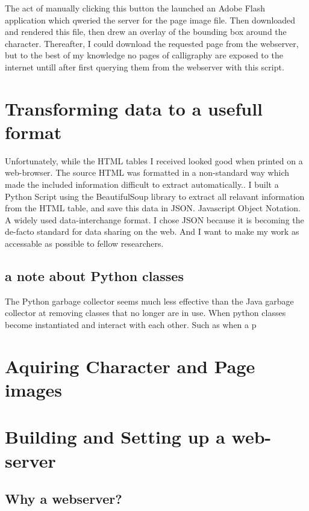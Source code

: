 The act of manually clicking this button the launched an Adobe Flash application which qweried the server for the page image file.  Then downloaded and rendered this file, then drew an overlay of the bounding box around the character.  Thereafter, I could download the requested page from the webserver, but to the best of my knowledge no pages of calligraphy are exposed to the internet untill after first querying them from the webserver with this script.


\section{Transforming data to a usefull format}

Unfortunately, while the HTML tables I received looked good when printed on a web-browser.  The source HTML was formatted in a non-standard way which made the included information difficult to extract automatically..  I built a Python Script using the BeautifulSoup library to extract all relavant information from the HTML table, and save this data in JSON.  Javascript Object Notation.  A widely used data-interchange format.  I chose JSON because it is becoming the de-facto standard for data sharing on the web.  And I want to make my work as accessable as possible to fellow researchers.

\subsection{a note about Python classes}

The Python garbage collector seems much less effective than the Java garbage collector at removing classes that no longer are in use.  When python classes become instantiated and interact with each other.  Such as when a p



\section{Aquiring Character and Page images}


\section{Building and Setting up a web-server}

\subsection{Why a webserver?}

